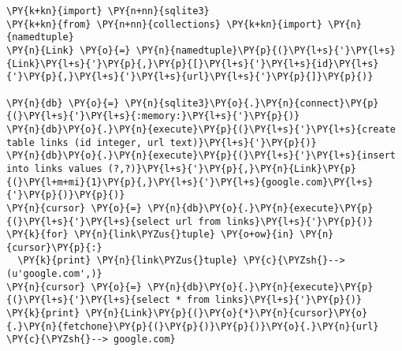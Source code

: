 \begin{Verbatim}[commandchars=\\\{\}]
\PY{k+kn}{import} \PY{n+nn}{sqlite3}
\PY{k+kn}{from} \PY{n+nn}{collections} \PY{k+kn}{import} \PY{n}{namedtuple}
\PY{n}{Link} \PY{o}{=} \PY{n}{namedtuple}\PY{p}{(}\PY{l+s}{'}\PY{l+s}{Link}\PY{l+s}{'}\PY{p}{,}\PY{p}{[}\PY{l+s}{'}\PY{l+s}{id}\PY{l+s}{'}\PY{p}{,}\PY{l+s}{'}\PY{l+s}{url}\PY{l+s}{'}\PY{p}{]}\PY{p}{)}

\PY{n}{db} \PY{o}{=} \PY{n}{sqlite3}\PY{o}{.}\PY{n}{connect}\PY{p}{(}\PY{l+s}{'}\PY{l+s}{:memory:}\PY{l+s}{'}\PY{p}{)}
\PY{n}{db}\PY{o}{.}\PY{n}{execute}\PY{p}{(}\PY{l+s}{'}\PY{l+s}{create table links (id integer, url text)}\PY{l+s}{'}\PY{p}{)}
\PY{n}{db}\PY{o}{.}\PY{n}{execute}\PY{p}{(}\PY{l+s}{'}\PY{l+s}{insert into links values (?,?)}\PY{l+s}{'}\PY{p}{,}\PY{n}{Link}\PY{p}{(}\PY{l+m+mi}{1}\PY{p}{,}\PY{l+s}{'}\PY{l+s}{google.com}\PY{l+s}{'}\PY{p}{)}\PY{p}{)}
\PY{n}{cursor} \PY{o}{=} \PY{n}{db}\PY{o}{.}\PY{n}{execute}\PY{p}{(}\PY{l+s}{'}\PY{l+s}{select url from links}\PY{l+s}{'}\PY{p}{)}
\PY{k}{for} \PY{n}{link\PYZus{}tuple} \PY{o+ow}{in} \PY{n}{cursor}\PY{p}{:}
  \PY{k}{print} \PY{n}{link\PYZus{}tuple} \PY{c}{\PYZsh{}--> (u'google.com',)}
\PY{n}{cursor} \PY{o}{=} \PY{n}{db}\PY{o}{.}\PY{n}{execute}\PY{p}{(}\PY{l+s}{'}\PY{l+s}{select * from links}\PY{l+s}{'}\PY{p}{)}
\PY{k}{print} \PY{n}{Link}\PY{p}{(}\PY{o}{*}\PY{n}{cursor}\PY{o}{.}\PY{n}{fetchone}\PY{p}{(}\PY{p}{)}\PY{p}{)}\PY{o}{.}\PY{n}{url} \PY{c}{\PYZsh{}--> google.com}
\end{Verbatim}
